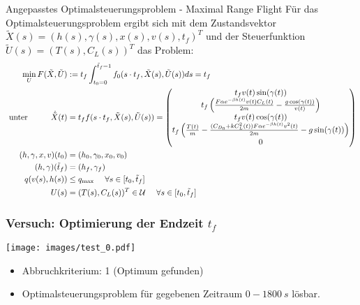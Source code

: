 \documentclass[aspectratio=169]{beamer}
\begin{document}
\begin{frame}
  	\begin{center}
 	\begin{block}{Angepasstes Optimalsteuerungsproblem - Maximal Range Flight}
    \scriptsize   
    Für das Optimalsteuerungsproblem ergibt sich mit dem Zustandsvektor $\tilde{X}(s) = (h(s),\gamma(s),x(s),v(s),t_f)^T$ und der Steuerfunktion $\tilde{U}(s) = (T(s),C_L(s))^T$ das Problem:
	\begin{align*}
		\min_{U} F(\tilde{X},\tilde{U}) &:= t_f \int^{\tilde{t}_f = 1}_{t_0 = 0} f_0(s \cdot t_f,\tilde{X}(s),\tilde{U}(s)) ds = t_f \\\
		\text{unter} \hspace{10mm} \dot{\tilde{X}}(t) &= t_f f(s \cdot t_f,\tilde{X}(s),\tilde{U}(s)) = \begin{pmatrix}
		t_f v(t) \sin(\gamma(t)) \\ 
		t_f \left( \frac{F \alpha e^{-\beta h(t)} v(t) C_L(t)}{2m} - \frac{g \cos(\gamma(t))}{v(t)} \right) \\ 
		t_f v(t) \cos(\gamma(t)) \\ 
		t_f \left( \frac{T(t)}{m} - \frac{(C_{D_0} + k C_L^2(t)) F \alpha e^{-\beta h(t)} v^2(t)}{2m} - g \sin(\gamma(t)) \right) \\
0
		\end{pmatrix} \\\
		(h,\gamma,x,v)(t_0) &= (h_0,\gamma_0,x_0,v_0) \\\
		(h,\gamma)(\tilde{t}_f) &= (h_f,\gamma_f) \\\
		q(v(s),h(s)) &\leq q_{\max}  \ \ \ \ \forall s \in [t_0,\tilde{t}_f]\\\
		U(s) &= (T(s),C_L(s))^T \in \mathcal{U} \ \ \ \ \forall s \in [t_0,\tilde{t}_f]
	\end{align*}
  	\end{block}
  	\end{center}
\end{frame}

\begin{frame}
	\frametitle{Versuch: Optimierung der Endzeit $t_f$}
  	\begin{center}
  		\texttt{[image: images/test\_0.pdf]}
  	\end{center}
  	\begin{itemize}
    	\item Abbruchkriterium: 1 (Optimum gefunden)
    	\item Optimalsteuerungsproblem für gegebenen Zeitraum $0 - 1800 \ s$ lösbar.
  	\end{itemize}
\end{frame}
\end{document}
